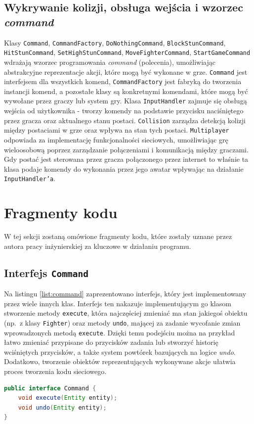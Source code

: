 \subsection{Wykrywanie kolizji, obsługa wejścia i wzorzec \emph{command} \cite{GPP}}
Klasy \texttt{Command}, \texttt{CommandFactory}, \texttt{DoNothingCommand}, \texttt{BlockStunCommand}, \texttt{HitStunCommand}, \texttt{SetHighStunCommand}, \texttt{MoveFighterCommand}, \texttt{StartGameCommand} wdrażają wzorzec programowania \emph{command} (polecenia), umożliwiając abstrakcyjne reprezentacje akcji, które mogą być wykonane w grze. \texttt{Command} jest interfejsem dla wszystkich komend, \texttt{CommandFactory} jest fabryką do tworzenia instancji komend, a pozostałe klasy są konkretnymi komendami, które mogą być wywołane przez graczy lub system gry. Klasa \texttt{InputHandler} zajmuje się obsługą wejścia od użytkownika - tworzy komendy na podstawie przycisku naciśniętego przez gracza oraz aktualnego stanu postaci. \texttt{Collision} zarządza detekcją kolizji między postaciami w grze oraz wpływa na stan tych postaci. \texttt{Multiplayer} odpowiada za implementację funkcjonalności sieciowych, umożliwiając grę wieloosobową poprzez zarządzanie połączeniami i komunikacją między graczami. Gdy postać jest sterowana przez gracza połączonego przez internet to właśnie ta klasa podaje komendy do wykonania przez jego awatar wpływając na działanie \texttt{InputHandler'a}.

\section{Fragmenty kodu}
W tej sekcji zostaną omówione fragmenty kodu, które zostały uznane przez autora pracy inżynierskiej za kluczowe w działaniu programu.
\subsection{Interfejs \texttt{Command}}
Na listingu \ref{list:command} zaprezentowano interfejs, który jest implementowany przez wiele innych klas. Interfejs ten nakazuje implementującym go klasom stworzenie metody \texttt{execute}, która najczęściej zmieniać ma stan jakiegoś obiektu (np.\ z klasy \texttt{Fighter}) oraz metody \texttt{undo}, mającej za zadanie wycofanie zmian wprowadzonych metodą \texttt{execute}. Dzięki temu podejściu można na przykład łatwo zmieniać przypisane do przycisków zadania lub stworzyć historię wciśniętych przycisków, a także system powtórek bazujących na logice \emph{undo}. Dodatkowo, tworzenie obiektów reprezentujących wykonywane akcje ułatwia proces tworzenia kodu sieciowego.
\begin{lstlisting}[language=Java,style=JavaStyle,label=list:command,caption=Interfejs \texttt{Command},
                   basicstyle=\footnotesize\ttfamily]
public interface Command {
    void execute(Entity entity);
    void undo(Entity entity);
}
\end{lstlisting}

